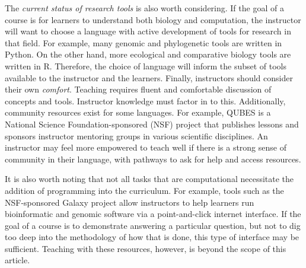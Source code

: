 The \textit{current status of research tools} is also worth considering. 
If the goal of a course is for learners to understand both biology and computation, the instructor will want to choose a language with active development of tools for research in that field.
For example, many genomic and phylogenetic tools are written in Python. 
On the other hand, more ecological and comparative biology tools are written in R.
Therefore, the choice of language will inform the subset of tools available to the instructor and the learners.
Finally, instructors should consider their own \textit{comfort}. 
Teaching requires fluent and comfortable discussion of concepts and tools.
Instructor knowledge must factor in to this.
Additionally, community resources exist for some languages. 
For example, QUBES is a National Science Foundation-sponsored (NSF) project that publishes lessons and sponsors instructor mentoring groups in various scientific disciplines.
An instructor may feel more empowered to teach well if there is a strong sense of community in their language, with pathways to ask for help and access resources.

It is also worth noting that not all tasks that are computational necessitate the addition of programming into the curriculum.
For example, tools such as the NSF-sponsored Galaxy project allow instructors to help learners run bioinformatic and genomic software via a point-and-click internet interface.
If the goal of a course is to demonstrate answering a particular question, but not to dig too deep into the methodology of how that is done, this type of interface may be sufficient.
Teaching with these resources, however, is beyond the scope of this article.





